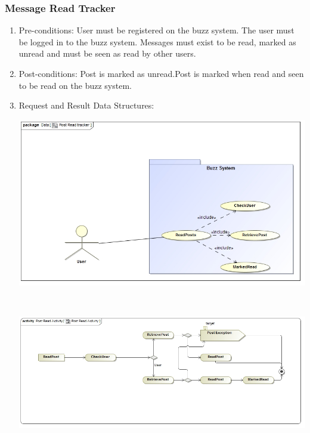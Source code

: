 \documentclass[hidelinks, 12pt, oneside]{article}
\begin{document}
\subsubsection{Message Read Tracker}
\begin{enumerate}
 \item Pre-conditions:  User must be registered on the buzz system. The user must be logged in to the buzz system. Messages must exist to be read, marked as unread and must be seen as read by other users.

 \item Post-conditions: Post is marked as unread.Post is marked when read and seen to be read on the buzz system.

 \item Request and Result Data Structures:\\
   \centerline{\includegraphics[scale=0.4]{PostReadTracker}}\\
 \centerline{\includegraphics[scale=0.4]{PostReadActivity}} 
\end{enumerate}
\end{document}

